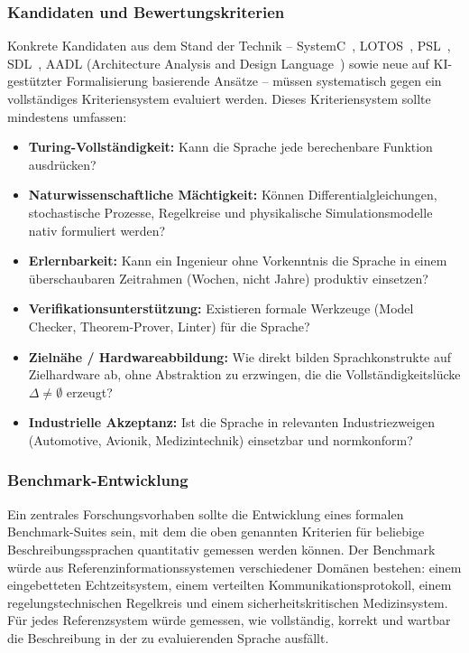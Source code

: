 ﻿\documentclass[a4paper,12pt]{article}
\theoremstyle{definition}
\begin{document}
\subsubsection{Kandidaten und Bewertungskriterien}

Konkrete Kandidaten aus dem Stand der Technik -- SystemC~\cite{systemc2012},
LOTOS~\cite{lotos1988}, PSL~\cite{psl2005}, SDL~\cite{sdl2000}, AADL (Architecture
Analysis and Design Language~\cite{aadl2004}) sowie neue auf KI-gestützter
Formalisierung basierende Ansätze -- müssen systematisch gegen ein vollständiges
Kriteriensystem evaluiert werden. Dieses Kriteriensystem sollte mindestens umfassen:

\begin{itemize}
  \item \textbf{Turing-Vollständigkeit:} Kann die Sprache jede berechenbare Funktion ausdrücken?
  \item \textbf{Naturwissenschaftliche Mächtigkeit:} Können Differentialgleichungen,
        stochastische Prozesse, Regelkreise und physikalische Simulationsmodelle nativ
        formuliert werden?
  \item \textbf{Erlernbarkeit:} Kann ein Ingenieur ohne Vorkenntnis die Sprache in einem
        überschaubaren Zeitrahmen (Wochen, nicht Jahre) produktiv einsetzen?
  \item \textbf{Verifikationsunterstützung:} Existieren formale Werkzeuge
        (Model Checker, Theorem-Prover, Linter) für die Sprache?
  \item \textbf{Zielnähe / Hardwareabbildung:} Wie direkt bilden Sprachkonstrukte
        auf Zielhardware ab, ohne Abstraktion zu erzwingen, die die Vollständigkeitslücke
        $\Delta \neq \emptyset$ erzeugt?
  \item \textbf{Industrielle Akzeptanz:} Ist die Sprache in relevanten Industriezweigen
        (Automotive, Avionik, Medizintechnik) einsetzbar und normkonform?
\end{itemize}

\subsubsection{Benchmark-Entwicklung}

Ein zentrales Forschungsvorhaben sollte die Entwicklung eines formalen Benchmark-Suites
sein, mit dem die oben genannten Kriterien für beliebige Beschreibungssprachen quantitativ
gemessen werden können. Der Benchmark würde aus Referenzinformationssystemen verschiedener
Domänen bestehen: einem eingebetteten Echtzeitsystem, einem verteilten Kommunikationsprotokoll,
einem regelungstechnischen Regelkreis und einem sicherheitskritischen Medizinsystem.
Für jedes Referenzsystem würde gemessen, wie vollständig, korrekt und wartbar die Beschreibung
in der zu evaluierenden Sprache ausfällt.
\end{document}
